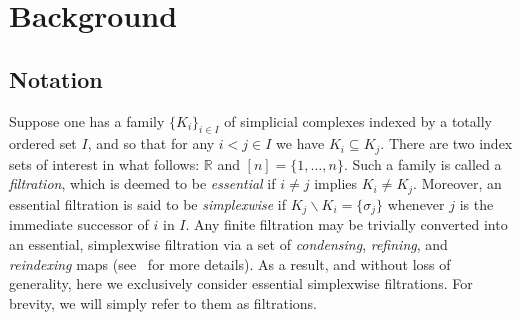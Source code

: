 \documentclass{siamart190516}
\begin{document}
\section{Background}\label{sec:background} 
\subsection{Notation}\label{sec:notation} 

Suppose one has a family $\{K_i\}_{i\in I}$ of simplicial complexes indexed by a totally ordered   set $I$, and so that for any $i< j \in I$ we have $K_i \subseteq K_j$. There are two index sets of interest in what follows: $\mathbb{R}$ and $[n] = \{ 1, \dots, n\}$. 
Such a family is called a \emph{filtration},
which is deemed to be \emph{essential} if $i \neq j$ implies $K_i \neq K_j$.
Moreover, an essential filtration is said to be  \emph{simplexwise} if $K_j \smallsetminus K_i = \{\sigma_j\}$ 
whenever $j$ is the immediate successor of $i$ in $I$.
Any finite filtration may be trivially converted into an essential, simplexwise filtration via a set of \emph{condensing}, \emph{refining}, and \emph{reindexing} maps (see~\cite{bauer2021ripser} for more details). 
As a result, and without loss of generality, here we exclusively consider essential simplexwise filtrations. For brevity, we will simply refer to them as filtrations. 
\end{document}
